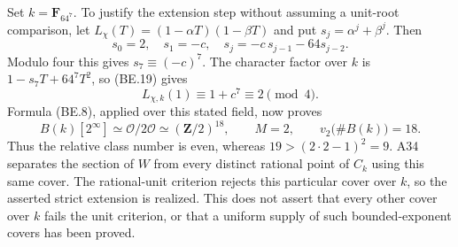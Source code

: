 Set $k=\mathbf F_{64^7}$. To justify the extension step
without assuming a unit-root comparison, let
$L_\chi(T)=(1-\alpha T)(1-\beta T)$ and put
$s_j=\alpha^j+\beta^j$. Then
\[
 s_0=2,\quad s_1=-c,\quad
 s_j=-c\,s_{j-1}-64s_{j-2}.
 \tag{BE.20}
\]
Modulo four this gives $s_7\equiv(-c)^7$.
The character factor over $k$ is
$1-s_7T+64^7T^2$, so (BE.19) gives
\[
 L_{\chi,k}(1)\equiv1+c^7\equiv2\pmod4.
\]
Formula (BE.8), applied over this stated field, now proves
\[
 B(k)[2^\infty]\simeq\mathcal O/2\mathcal O
                  \simeq(\mathbf Z/2)^{18},
 \qquad M=2,
 \qquad v_2\bigl(\#B(k)\bigr)=18.
 \tag{BE.21}
\]
Thus the relative class number is even, whereas
$19>(2\cdot2-1)^2=9$. A34 separates the section of $W$
from every distinct rational point of $C_k$ using this same
cover. The rational-unit criterion rejects this particular
cover over $k$, so the asserted strict extension is realized.
This does not assert that every other cover over $k$ fails
the unit criterion, or that a uniform supply of such
bounded-exponent covers has been proved.
